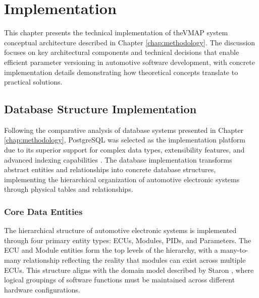 \chapter{Implementation}
\label{chap:implementation}

This chapter presents the technical implementation of the\ac{VMAP} system conceptual architecture described in Chapter \ref{chap:methodology}. The discussion focuses on key architectural components and technical decisions that enable efficient parameter versioning in automotive software development, with concrete implementation details demonstrating how theoretical concepts translate to practical solutions.

\section{Database Structure Implementation}
\label{sec:database-structure-implementation}

Following the comparative analysis of database systems presented in Chapter \ref{chap:methodology}, PostgreSQL was selected as the implementation platform due to its superior support for complex data types, extensibility features, and advanced indexing capabilities \cite{obe2017postgresql}. The database implementation transforms abstract entities and relationships into concrete database structures, implementing the hierarchical organization of automotive electronic systems through physical tables and relationships.

\subsection{Core Data Entities}
\label{subsec:core-data-entities}

The hierarchical structure of automotive electronic systems is implemented through four primary entity types: \acp{ECU}, Modules, PIDs, and Parameters. The \ac{ECU} and Module entities form the top levels of the hierarchy, with a many-to-many relationship reflecting the reality that modules can exist across multiple \acp{ECU}. This structure aligns with the domain model described by Staron \cite{staron2021automotive}, where logical groupings of software functions must be maintained across different hardware configurations.

